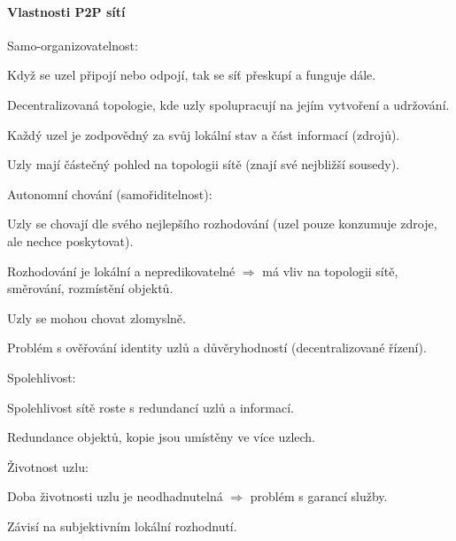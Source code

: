 \paragraph*{Vlastnosti P2P sítí} \begin{compactitem}

    \item Samo-organizovatelnost: \begin{compactitem}
        \item Když se uzel připojí nebo odpojí, tak se síť přeskupí a funguje dále.
        \item Decentralizovaná topologie, kde uzly spolupracují na jejím vytvoření a udržování.
        \item Každý uzel je zodpovědný za svůj lokální stav a část informací (zdrojů).
        \item Uzly mají částečný pohled na topologii sítě (znají své nejbližší sousedy).
    \end{compactitem}

    \item Autonomní chování (samořiditelnost): \begin{compactitem}
        \item Uzly se chovají dle svého nejlepšího rozhodování (uzel pouze konzumuje zdroje, ale nechce poskytovat).
        \item Rozhodování je lokální a nepredikovatelné $\Rightarrow$ má vliv na topologii sítě, směrování, rozmístění objektů.
        \item Uzly se mohou chovat zlomyslně.
        \item Problém s ověřování identity uzlů a důvěryhodností (decentralizované řízení).
    \end{compactitem}

    \item Spolehlivost: \begin{compactitem}
        \item Spolehlivost sítě roste s redundancí uzlů a informací.
        \item Redundance objektů, kopie jsou umístěny ve více uzlech.
    \end{compactitem}

    \item Životnost uzlu: \begin{compactitem}
        \item Doba životnosti uzlu je neodhadnutelná $\Rightarrow$ problém s garancí služby.
        \item Závisí na subjektivním lokální rozhodnutí.
    \end{compactitem}

\end{compactitem}

